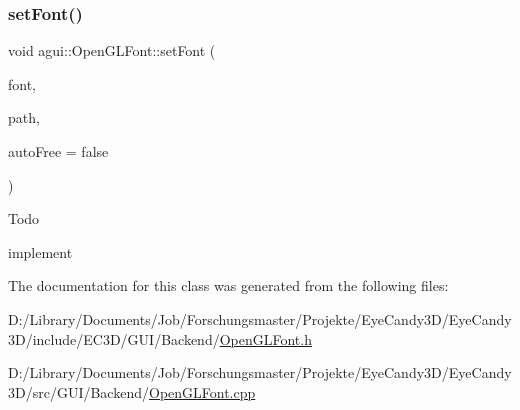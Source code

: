 \subsubsection{\texorpdfstring{set\+Font()}{setFont()}}
{\footnotesize\ttfamily void agui\+::\+Open\+G\+L\+Font\+::set\+Font (\begin{DoxyParamCaption}\item[{\mbox{\hyperlink{classec_1_1_font_texture_atlas}{ec\+::\+Font\+Texture\+Atlas}} $\ast$}]{font,  }\item[{const std\+::string \&}]{path,  }\item[{bool}]{auto\+Free = {\ttfamily false} }\end{DoxyParamCaption})\hspace{0.3cm}{\ttfamily [virtual]}}

\begin{DoxyRefDesc}{Todo}
\item[\mbox{\hyperlink{todo__todo000002}{Todo}}]implement \end{DoxyRefDesc}


The documentation for this class was generated from the following files\+:\begin{DoxyCompactItemize}
\item 
D\+:/\+Library/\+Documents/\+Job/\+Forschungsmaster/\+Projekte/\+Eye\+Candy3\+D/\+Eye\+Candy3\+D/include/\+E\+C3\+D/\+G\+U\+I/\+Backend/\mbox{\hyperlink{_open_g_l_font_8h}{Open\+G\+L\+Font.\+h}}\item 
D\+:/\+Library/\+Documents/\+Job/\+Forschungsmaster/\+Projekte/\+Eye\+Candy3\+D/\+Eye\+Candy3\+D/src/\+G\+U\+I/\+Backend/\mbox{\hyperlink{_open_g_l_font_8cpp}{Open\+G\+L\+Font.\+cpp}}\end{DoxyCompactItemize}
